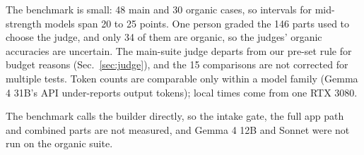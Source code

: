 The benchmark is small: 48 main and 30 organic cases, so intervals for mid-strength models span 20 to 25 points.
One person graded the 146 parts used to choose the judge, and only 34 of them are organic, so the judges' organic accuracies are uncertain.
The main-suite judge departs from our pre-set rule for budget reasons (Sec.~\ref{sec:judge}), and the 15 comparisons are not corrected for multiple tests.
Token counts are comparable only within a model family (Gemma 4 31B's API under-reports output tokens); local times come from one RTX 3080.

The benchmark calls the builder directly, so the intake gate, the full app path and combined parts are not measured, and Gemma 4 12B and Sonnet were not run on the organic suite.
